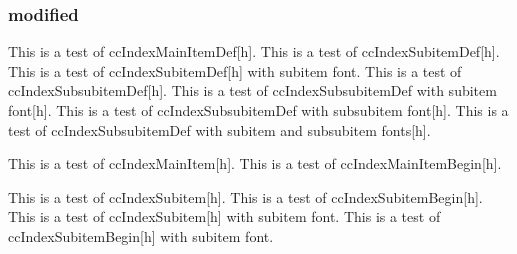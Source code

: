 \documentclass{article}
\begin{document}
{{{{\subsubsection{modified}
This is a test of ccIndexMainItemDef[h].
This is a test of ccIndexSubitemDef[h].
This is a test of ccIndexSubitemDef[h] with subitem font.
This is a test of ccIndexSubsubitemDef[h].
This is a test of ccIndexSubsubitemDef with subitem font[h].
This is a test of ccIndexSubsubitemDef with subsubitem font[h].
This is a test of ccIndexSubsubitemDef with subitem and subsubitem fonts[h].

\pagebreak

This is a test of ccIndexMainItem[h].
This is a test of ccIndexMainItemBegin[h].

This is a test of ccIndexSubitem[h].
This is a test of ccIndexSubitemBegin[h].
This is a test of ccIndexSubitem[h] with subitem font.
This is a test of ccIndexSubitemBegin[h] with subitem font.

}}}}
\end{document}

